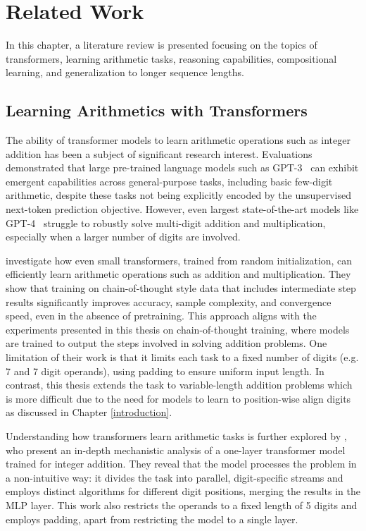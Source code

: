 \chapter{Related Work}\label{related_work}

In this chapter, a literature review is presented focusing on the topics of transformers, learning arithmetic tasks, reasoning capabilities, compositional learning, and generalization to longer sequence lengths.

\section{Learning Arithmetics with Transformers}\label{sec:sota_arithmetic_tasks}

The ability of transformer models \parencite{vaswani_attention_2017} to learn arithmetic operations such as integer addition has been a subject of significant research interest. Evaluations demonstrated that large pre-trained language models such as GPT-3~\parencite{brown_language_2020} can exhibit emergent capabilities across general-purpose tasks, including basic few-digit arithmetic, despite these tasks not being explicitly encoded by the unsupervised next-token prediction objective. However, even largest state-of-the-art models like GPT-4~\parencite{achiam_gpt-4_2023} struggle to robustly solve multi-digit addition and multiplication, especially when a larger number of digits are involved.

\cite{lee_teaching_2023} investigate how even small transformers, trained from random initialization, can efficiently learn arithmetic operations such as addition and multiplication. They show that training on chain-of-thought style data that includes intermediate step results significantly improves accuracy, sample complexity, and convergence speed, even in the absence of pretraining. This approach aligns with the experiments presented in this thesis on chain-of-thought training, where models are trained to output the steps involved in solving addition problems. One limitation of their work is that it limits each task to a fixed number of digits (e.g. 7 and 7 digit operands), using padding to ensure uniform input length. In contrast, this thesis extends the task to variable-length addition problems which is more difficult due to the need for models to learn to position-wise align digits as discussed in Chapter \ref{introduction}.

Understanding how transformers learn arithmetic tasks is further explored by \cite{quirke_understanding_2023}, who present an in-depth mechanistic analysis of a one-layer transformer model trained for integer addition. They reveal that the model processes the problem in a non-intuitive way: it divides the task into parallel, digit-specific streams and employs distinct algorithms for different digit positions, merging the results in the MLP layer. This work also restricts the operands to a fixed length of 5 digits and employs padding, apart from restricting the model to a single layer.

